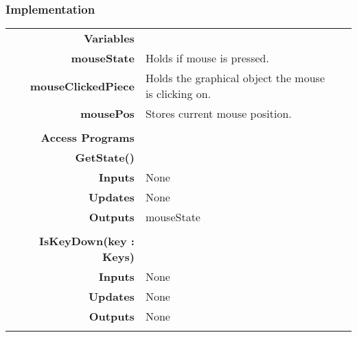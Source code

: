 \documentclass[10pt]{article}
\begin{document}
    \subsubsection{Implementation}
        \begin{tabularx}{\linewidth}{ >{\bfseries}r Xp{5cm} }
            Variables       & \begin{tabular}[t]{@{} l p{8cm}} 
                                     & \\
                                    mouseState & Holds if mouse is pressed. \\
                                    mouseClickedPiece & Holds the graphical object the mouse is clicking on. \\
                                    mousePos & Stores current mouse position. \\
                              \end{tabular} \\

            Access Programs & \begin{tabular}[t]{@{} l l p{8cm}} 
                                     & \\
                                    \bf{GetState()} & \\
                                    Inputs &  None \\
                                    Updates & None \\
                                    Outputs & mouseState \\
                                     & \\
                                    \bf{IsKeyDown(key : Keys)} & \\
                                    Inputs & None \\
                                    Updates & None \\
                                    Outputs & None \\ 
                              \end{tabular} \\
                              
        \end{tabularx}
        
\end{document}

